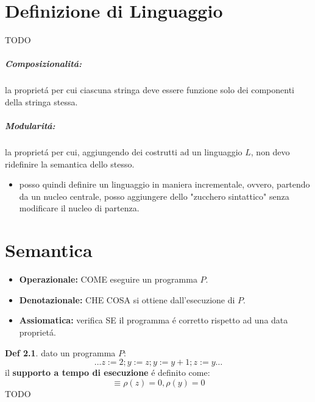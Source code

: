 \documentclass[a4paper]{report}
\theoremstyle{definition} \newtheorem*{defi}{Def}
\theoremstyle{plain} \newtheorem{lemma}{Lemma}
\theoremstyle{plain} \newtheorem{teo}{Teorema}
\theoremstyle{remark} \newtheorem*{es}{Esempio}
\begin{document}
\chapter{Definizione di Linguaggio}
TODO
\paragraph{Composizionalit\'a:}
la propriet\'a per cui ciascuna stringa deve essere funzione solo dei componenti della stringa stessa.
\paragraph{Modularit\'a:}
la propriet\'a per cui, aggiungendo dei costrutti ad un linguaggio $L$, non devo ridefinire la semantica dello stesso.
\begin{itemize}
\item posso quindi definire un linguaggio in maniera incrementale, ovvero, partendo da un nucleo centrale, posso aggiungere dello "zucchero sintattico" senza modificare il nucleo di partenza.
\end{itemize}

\chapter{Semantica}
\begin{itemize}
\item {\bf Operazionale:} COME eseguire un programma $P$.
\item {\bf Denotazionale:} CHE COSA si ottiene dall'esecuzione di $P$.
\item {\bf Assiomatica:} verifica SE il programma \'e corretto rispetto ad una data propriet\'a.
\end{itemize}

\begin{defi} dato un programma $P$:
\begin{equation}
{\ldots}z:=2; y:=z; y:=y+1; z:=y{\ldots}
\end{equation}
il {\bf supporto a tempo di esecuzione} \'e definito come:
\begin{equation}
[z=0, y=0] \equiv \rho(z) = 0, \rho(y) = 0
\end{equation}
TODO
\end{defi}
\newpage
\end{document}
